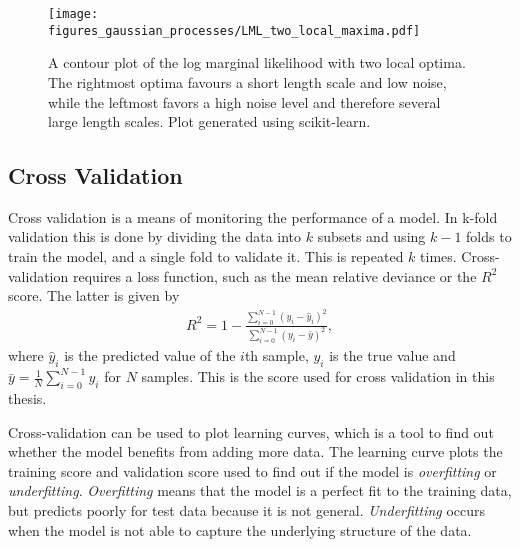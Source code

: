 \documentclass[twoside,english]{uiofysmaster}
\begin{document}
\begin{figure}
\centering
\texttt{[image: figures\_gaussian\_processes/LML\_two\_local\_maxima.pdf]}
\caption{A contour plot of the log marginal likelihood with two local optima. The rightmost optima favours a short length scale and low noise, while the leftmost favors a high noise level and therefore several large length scales. Plot generated using scikit-learn.}
\label{Fig:: gaussian process : LML several local optima}
\end{figure}


\subsection{Cross Validation}


Cross validation is a means of monitoring the performance of a model. In k-fold validation this is done by dividing the data into $k$ subsets and using $k-1$ folds to train the model, and a single fold to validate it. This is repeated $k$ times. Cross-validation requires a loss function, such as the mean relative deviance or the $R^2$ score. The latter is given by 
\begin{align}
R^2 = 1 - \frac{\sum_{i=0}^{N-1} (y_i - \hat{y}_i)^2}{\sum_{i=0}^{N-1} (y_i - \bar{y})^2},
\end{align}
where $\hat{y}_i$ is the predicted value of the $i$th sample, $y_i$ is the true value and $\bar{y} = \frac{1}{N} \sum_{i = 0}^{N-1} y_i$ for $N$ samples. This is the score used for cross validation in this thesis.

Cross-validation can be used to plot learning curves, which is a tool to find out whether the model benefits from adding more data. The learning curve plots the training score and validation score used to find out if the model is \textit{overfitting} or \textit{underfitting}. \textit{Overfitting} means that the model is a perfect fit to the training data, but predicts poorly for test data because it is not general. \textit{Underfitting} occurs when the model is not able to capture the underlying structure of the data. 
\end{document}

